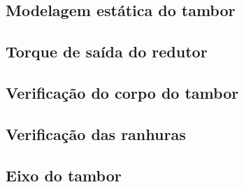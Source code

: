 \subsection{Modelagem estática do tambor}


\subsection{Torque de saída do redutor}


\subsection{Verificação do corpo do tambor}


\subsection{Verificação das ranhuras}


\subsection{Eixo do tambor}


